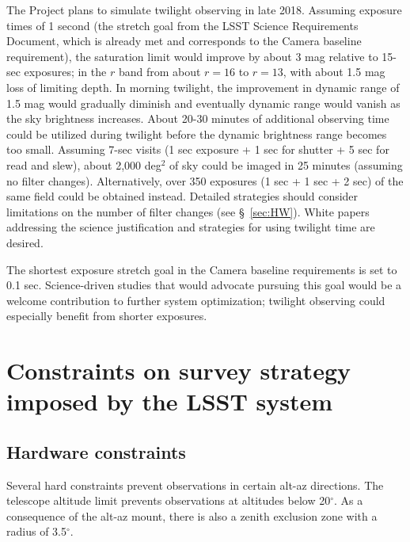 \documentclass[DM,lsstdraft,toc,usenatbib]{lsstdoc}
\begin{document}
The Project plans to simulate twilight observing in late 2018. 
Assuming exposure times of 1 second (the stretch goal from the LSST Science Requirements Document, 
which is already met and corresponds to the Camera baseline requirement), the saturation limit would 
improve by about 3 mag relative to 15-sec exposures; in the $r$ band from about $r=16$ to $r=13$,
with about 1.5 mag loss of limiting depth. In morning twilight, the improvement in dynamic range of 1.5 mag would gradually
diminish and eventually dynamic range would vanish as the sky brightness increases. About 20-30 minutes
of additional observing time could be utilized during twilight before the dynamic brightness range becomes
too small. Assuming 7-sec visits (1 sec exposure + 1 sec for shutter + 5 sec for read and slew), about 
2,000 deg$^2$ of sky could be imaged in 25 minutes (assuming no filter changes). Alternatively, over 
350 exposures (1 sec + 1 sec + 2 sec) of the same field could be obtained instead.  Detailed strategies
should consider limitations on the number of filter changes (see \S~\ref{sec:HW}). 
White papers addressing the science justification and strategies for using twilight time are desired.

The shortest exposure stretch goal in the Camera baseline requirements is set to 0.1 sec. Science-driven
studies that would advocate pursuing this goal would be a welcome contribution to further system
optimization; twilight observing could especially benefit from shorter exposures. 
 

\section{Constraints on survey strategy imposed by the LSST system} 

\subsection{Hardware constraints \label{sec:HW}}

Several hard constraints prevent observations in certain alt-az directions. The telescope altitude limit
prevents observations at altitudes below 20$^\circ$.  As a consequence of the alt-az mount, there
is also a zenith exclusion zone with a radius of 3.5$^\circ$. 
\end{document}
